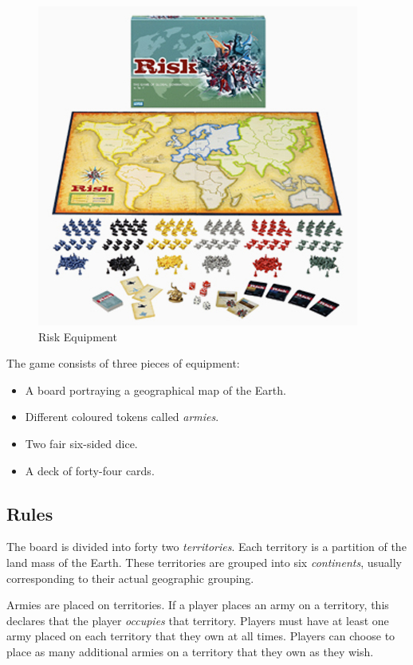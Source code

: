 \documentclass[parskip]{cs4rep}
\begin{document}
\begin{figure}[h]
\centering
\includegraphics{images/risk-board}
\caption{Risk Equipment \cite{riskimage}}
\label{fig:risk-equipment}
\end{figure}

The game consists of three pieces of equipment:

\begin{itemize}
\item
A board portraying a geographical map of the Earth.
\item
Different coloured tokens called \textit{armies}.
\item
Two fair six-sided dice.
\item
A deck of forty-four cards.
\end{itemize}

\subsection{Rules}

The board is divided into forty two \textit{territories}. Each territory is a partition of the land mass of the Earth. These territories are grouped into six \textit{continents}, usually corresponding to their actual geographic grouping.

Armies are placed on territories. If a player places an army on a territory, this declares that the player \textit{occupies} that territory. Players must have at least one army placed on each territory that they own at all times. Players can choose to place as many additional armies on a territory that they own as they wish.
\end{document}
